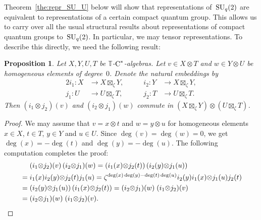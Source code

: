 \documentclass[a4paper]{amsart}
\numberwithin{equation}{section}
\newtheorem{Prop}[Thm]{Proposition}
\theoremstyle{definition}
\theoremstyle{remark}
\begin{document}
Theorem~\ref{the:repr_SU_U} below will show that representations
of~\({\textup{SU}}_q(2)\) are equivalent to representations of a certain
compact quantum group.  This allows us to carry over all the usual
structural results about representations of compact quantum groups
to~\({\textup{SU}}_q(2)\).  In particular, we may tensor representations.  To
describe this directly, we need the following result:

\begin{Prop}
  \label{komutacja}
  Let $X,Y,U,T$ be $\mathbb{T}${\nobreakdash}-${\textup{C}^*}$-algebras.  Let $v\in X{\otimes}
  T$ and $w\in Y{\otimes} U$ be homogeneous elements of degree~$0$.
  Denote the natural embeddings by
  \begin{alignat*}{2}
    i_{1}\colon X&\to X{\boxtimes}_\zeta Y,&\qquad
    i_{2}\colon Y&\to X{\boxtimes}_\zeta Y,\\
    j_{1}\colon U&\to U{\boxtimes}_\zeta T,&\qquad
    j_{2}\colon T&\to U{\boxtimes}_\zeta T.
  \end{alignat*}
  Then $(i_{1}{\otimes} j_{2})(v)$ and $(i_{2}{\otimes} j_{1})(w)$ commute in
  $(X{\boxtimes}_\zeta Y) {\otimes} (U{\boxtimes}_\zeta T)$.
\end{Prop}

\begin{proof}
  We may assume that $v=x{\otimes} t$ and $w=y{\otimes} u$ for homogeneous
  elements $x\in X$, $t\in T$, $y\in Y$ and $u\in U$.  Since
  $\deg(v)=\deg(w)=0$, we get $\deg(x)=-\deg(t)$ and
  $\deg(y)=-\deg(u)$.  The following computation completes the proof:
  \begin{align*}
    & \phantom{{}={}}(i_{1}{\otimes} j_{2})(v)\,(i_{2}{\otimes} j_{1})(w)
    = \left(i_{1}(x){\otimes} j_{2}(t)\right)\left(i_{2}(y){\otimes} j_{1}(u)\right)
    \\&= i_{1}(x)i_{2}(y){\otimes} j_{2}(t)j_{1}(u)
    = \zeta^{\deg(x)\deg(y)-\deg(t)\deg(u)}i_{2}(y)i_{1}(x){\otimes} j_{1}(u)j_{2}(t)
    \\& = \left(i_{2}(y){\otimes} j_{1}(u)\right)\left(i_{1}(x){\otimes} j_{2}(t)\right)
    = (i_{2}{\otimes} j_{1})(w)\;(i_{1}{\otimes} j_{2})(v)
    \\&= (i_{2}{\otimes} j_{1})(w)\;(i_{1}{\otimes} j_{2})(v).\qedhere
  \end{align*}
\end{proof}
\end{document}
